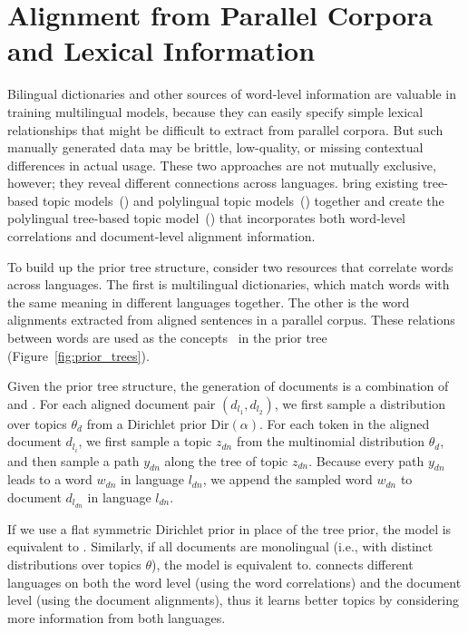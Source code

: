 
\section{Alignment from Parallel Corpora and Lexical Information}

Bilingual dictionaries and other sources of word-level information are 
valuable in training multilingual models, because they can easily specify 
simple lexical relationships that might be difficult to extract from parallel corpora.
But such manually generated data may be brittle, low-quality, or missing contextual differences in actual usage.
These two approaches are not mutually exclusive, however; they reveal
different connections across languages. \citet{hu-14} bring existing
tree-based topic models~(\tlda{}) and polylingual topic
models~(\plda{}) together and create the polylingual tree-based topic
model~(\ptlda{}) that incorporates both word-level correlations and
document-level alignment information.

To build up the prior tree structure, \citet{hu-14} consider two
resources that correlate words across languages. The first is
multilingual dictionaries, which match words with the same meaning in
different languages together. The other is the word alignments
extracted from aligned sentences in a parallel corpus. These relations
between words are used as the concepts~\citep{Bhattacharya-2006} in
the prior tree (Figure~\ref{fig:prior_trees}).

Given the prior tree structure, the generation of documents is a
combination of \tlda{} and \plda{}.  For each aligned document pair
$(d_{l_1}, d_{l_2})$, we first sample a distribution over topics
$\theta_d$ from a Dirichlet prior $\text{Dir}(\alpha)$.  For each
token in the aligned document $d_{l_i}$, we first sample a topic
$z_{dn}$ from the multinomial distribution $\theta_d$, and then sample
a path $y_{dn}$ along the tree of topic $z_{dn}$. Because every path
$y_{dn}$ leads to a word $w_{dn}$ in language $l_{dn}$, we append the
sampled word $w_{dn}$ to document $d_{l_{dn}}$ in language $l_{dn}$.

If we use a flat symmetric Dirichlet prior in place of the tree prior,
the model is equivalent to \plda{}. Similarly, if all documents are monolingual (i.e., with
distinct distributions over topics $\theta$), the model is equivalent to\tlda{}. \ptlda{} connects different languages on both the word
level (using the word correlations) and the document level (using the
document alignments), thus it learns better topics by considering more
information from both languages.


